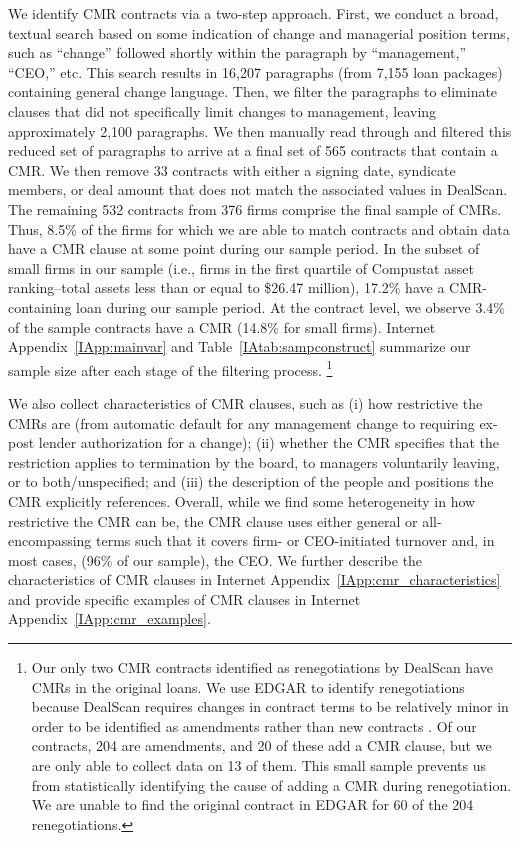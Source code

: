\documentclass[a4paper,12pt]{article}
\begin{document}
We identify CMR contracts via a two-step approach.
First, we conduct a broad, textual search based on some indication of change and managerial position terms, such as ``change'' followed shortly within the paragraph by ``management,'' ``CEO,'' etc.
This search results in 16,207 paragraphs (from 7,155 loan packages) containing general change language.
Then, we filter the paragraphs to eliminate clauses that did not specifically limit changes to management, leaving approximately 2,100 paragraphs.
We then manually read through and filtered this reduced set of paragraphs to arrive at a final set of 565 contracts that contain a CMR.
We then remove 33 contracts with either a signing date, syndicate members, or deal amount that does not match the associated values in DealScan.
The remaining 532 contracts from 376 firms comprise the final sample of CMRs.
Thus, 8.5\%  of the  firms for which we are able to match contracts and obtain data have a CMR clause at some point during our sample period.
In the subset of small firms in our sample (i.e., firms in the first quartile of Compustat asset ranking--total assets less than or equal to \$26.47 million), 17.2\% have a CMR-containing loan during our sample period.
At the contract level, we observe 3.4\% of the sample contracts have a CMR (14.8\% for small firms).
Internet Appendix~\ref{IApp:mainvar} and Table~\ref{IAtab:sampconstruct} summarize our sample size after each stage of the filtering process.%
	\footnote{Our only two CMR contracts identified as renegotiations by DealScan have CMRs in the original loans. We use EDGAR to identify renegotiations because DealScan requires changes in contract terms to be relatively minor in order to be identified as amendments rather than new contracts \citep{Nini_2009}.
	Of our contracts, 204 are amendments, and 20 of these add a CMR clause, but we are only able to collect data on 13 of them. This small sample prevents us from statistically identifying the cause of adding a CMR during renegotiation. We are unable to find the original contract in EDGAR for 60 of the 204 renegotiations.}


We also collect characteristics of CMR clauses, such as (i) how restrictive the CMRs are (from automatic default for any management change to requiring ex-post lender authorization for a change); (ii) whether the CMR specifies that the restriction applies to termination by the board, to managers voluntarily leaving, or to both/unspecified; and (iii) the description of the people and positions the CMR explicitly references.
Overall, while we find some heterogeneity in how restrictive the CMR can be, the CMR clause uses either general or all-encompassing terms such that it covers firm- or CEO-initiated turnover and, in most cases, (96\% of our sample), the CEO.
We further describe the characteristics of CMR clauses in Internet Appendix~\ref{IApp:cmr_characteristics} and provide specific examples of CMR clauses in Internet Appendix~\ref{IApp:cmr_examples}. 
\end{document}
